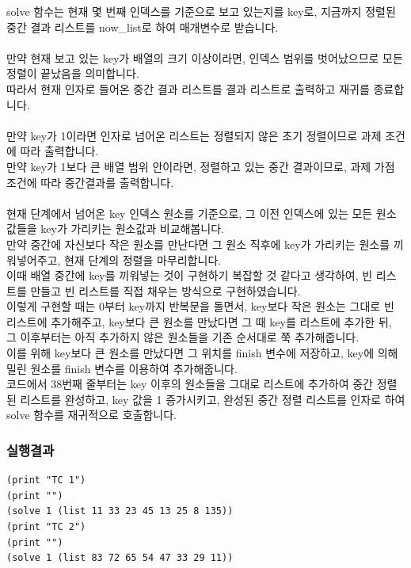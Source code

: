 \documentclass{article}
\begin{document}
solve 함수는 현재 몇 번째 인덱스를 기준으로 보고 있는지를 key로, 지금까지 정렬된 중간 결과 리스트를 now\_list로 하여 매개변수로 받습니다.\\\\
만약 현재 보고 있는 key가 배열의 크기 이상이라면, 인덱스 범위를 벗어났으므로 모든 정렬이 끝났음을 의미합니다.\\
따라서 현재 인자로 들어온 중간 결과 리스트를 결과 리스트로 출력하고 재귀를 종료합니다.\\\\
만약 key가 1이라면 인자로 넘어온 리스트는 정렬되지 않은 초기 정렬이므로 과제 조건에 따라 출력합니다.\\
만약 key가 1보다 큰 배열 범위 안이라면, 정렬하고 있는 중간 결과이므로, 과제 가점 조건에 따라 중간결과를 출력합니다.\\\\
현재 단계에서 넘어온 key 인덱스 원소를 기준으로, 그 이전 인덱스에 있는 모든 원소값들을 key가 가리키는 원소값과 비교해봅니다.\\
만약 중간에 자신보다 작은 원소를 만난다면 그 원소 직후에 key가 가리키는 원소를 끼워넣어주고, 현재 단계의 정렬을 마무리합니다.\\
이때 배열 중간에 key를 끼워넣는 것이 구현하기 복잡할 것 같다고 생각하여, 빈 리스트를 만들고 빈 리스트를 직접 채우는 방식으로 구현하였습니다.\\
이렇게 구현할 때는 0부터 key까지 반복문을 돌면서, key보다 작은 원소는 그대로 빈 리스트에 추가해주고, key보다 큰 원소를 만났다면 그 때 key를 리스트에 추가한 뒤, 그 이후부터는 아직 추가하지 않은 원소들을 기존 순서대로 쭉 추가해줍니다.\\
이를 위해 key보다 큰 원소를 만났다면 그 위치를 finish 변수에 저장하고, key에 의해 밀린 원소를 finish 변수를 이용하여 추가해줍니다.\\

코드에서 38번째 줄부터는 key 이후의 원소들을 그대로 리스트에 추가하여 중간 정렬된 리스트를 완성하고, key 값을 1 증가시키고, 완성된 중간 정렬 리스트를 인자로 하여 solve 함수를 재귀적으로 호출합니다.

\subsubsection{실행결과}
\begin{verbatim}
(print "TC 1")
(print "")
(solve 1 (list 11 33 23 45 13 25 8 135))
(print "TC 2")
(print "")
(solve 1 (list 83 72 65 54 47 33 29 11))
\end{verbatim}
\end{document}
